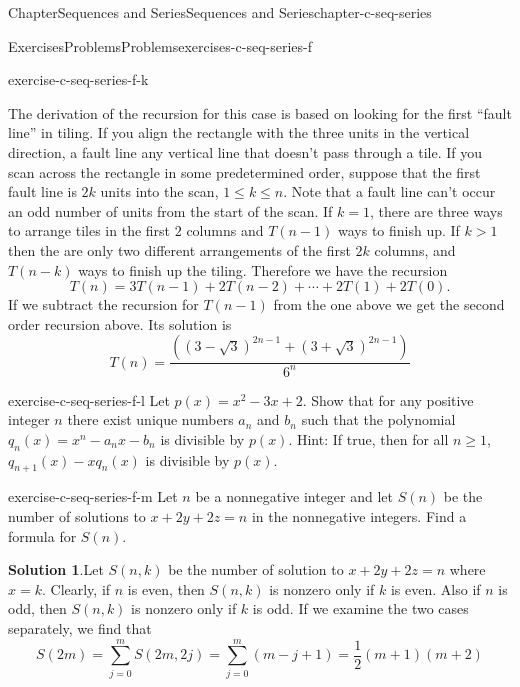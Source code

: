 \documentclass[oneside,10pt,]{book}
\newcommand{\blocktitlefont}{\relax}
\numberwithin{equation}{section}
\newcommand{\gt}{>}
\begin{document}
\begin{chapterptx}{Chapter}{Sequences and Series}{}{Sequences and Series}{}{}{chapter-c-seq-series}
\begin{exercises-section}{Exercises}{Problems}{}{Problems}{}{}{exercises-c-seq-series-f}
\begin{divisionexercise}{10}{}{}{exercise-c-seq-series-f-k}
\begin{enumerate}[label=(\alph*)]
The derivation of the recursion for this case is based on looking for the first ``fault line'' in tiling. If you align the rectangle with the three units in the vertical direction, a fault line any vertical line that doesn't pass through a tile.   If you scan across the rectangle in some predetermined order, suppose that the  first fault line is \(2 k\) units into the scan, \(1\leq k \leq n\). Note that a fault line can't occur an odd number of units from the start of the scan.  If \(k=1\), there are three ways to arrange tiles in the first \(2\) columns and \(T(n-1)\) ways to finish up.  If \(k \gt 1\) then the are only two different arrangements of the first \(2k\) columns, and \(T(n-k)\) ways to finish up the tiling.   Therefore we have the recursion%
\begin{equation*}
T(n)= 3 T(n-1) + 2 T(n-2)+ \cdots + 2 T(1) +2 T(0).
\end{equation*}
If we subtract the recursion for \(T(n-1)\) from the one above we get the second order recursion above.  Its solution is%
\begin{equation*}
T(n)=\frac{ \left(\left(3-\sqrt{3}\right)^{2
n-1}+\left(3+\sqrt{3}\right)^{2
n-1}\right)}{6^n}
\end{equation*}
%
\end{enumerate}
%
\end{divisionexercise}%
\begin{divisionexercise}{11}{}{}{exercise-c-seq-series-f-l}%
Let \(p(x)=x^2-3x + 2\).  Show that for any positive integer \(n\) there exist unique numbers \(a_n\) and \(b_n\) such that the polynomial \(q_n(x)=
x^n-a_nx-b_n\) is divisible by \(p(x)\).    Hint:  If true, then for all \(n\geq 1\),   \(q_{n+1}(x)-x q_n(x)\) is divisible by \(p(x)\).%
\end{divisionexercise}%
\begin{divisionexercise}{12}{}{}{exercise-c-seq-series-f-m}%
Let \(n\) be a nonnegative integer and let \(S(n)\) be the number of solutions to \(x + 2 y + 2 z = n\) in the nonnegative integers.  Find a formula for \(S(n)\).%
\par\smallskip%
\noindent\textbf{\blocktitlefont Solution 1}.\hypertarget{solution-c-seq-series-f-m-b}{}\quad{}Let \(S(n,k)\) be the number of solution to \(x+2y+2z=n\) where \(x=k\). Clearly, if \(n\) is even, then \(S(n,k)\) is nonzero only if \(k\) is even. Also if \(n\) is odd, then \(S(n,k)\) is nonzero only if \(k\) is odd. If we examine the two cases separately, we find that%
\begin{equation*}
S(2m) =\sum _{j=0}^m S(2 m,2 j)=\sum _{j=0}^m (m-j+1)=\frac{1}{2} (m+1) (m+2)

\end{equation*}
\end{divisionexercise}
\end{exercises-section}
\end{chapterptx}
\end{document}

